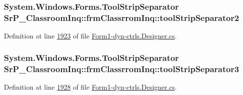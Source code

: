 \hypertarget{class_sr_p___classroom_inq_1_1frm_classrrom_inq_aa51d7952b4dde9caa9d7e111353a2047}{
\subsubsection[{tool\-Strip\-Separator2}]{\setlength{\rightskip}{0pt plus 5cm}\-System.\-Windows.\-Forms.\-Tool\-Strip\-Separator {\bf \-Sr\-P\-\_\-\-Classroom\-Inq\-::frm\-Classrrom\-Inq\-::tool\-Strip\-Separator2}}}
\label{class_sr_p___classroom_inq_1_1frm_classrrom_inq_aa51d7952b4dde9caa9d7e111353a2047}


\-Definition at line \hyperlink{_form1-dyn-ctrls_8_designer_8cs_source_l01923}{1923} of file \hyperlink{_form1-dyn-ctrls_8_designer_8cs_source}{\-Form1-\/dyn-\/ctrls.\-Designer.\-cs}.

\hypertarget{class_sr_p___classroom_inq_1_1frm_classrrom_inq_ac7f725652d980e8ef92f1119843f02a0}{
\subsubsection[{tool\-Strip\-Separator3}]{\setlength{\rightskip}{0pt plus 5cm}\-System.\-Windows.\-Forms.\-Tool\-Strip\-Separator {\bf \-Sr\-P\-\_\-\-Classroom\-Inq\-::frm\-Classrrom\-Inq\-::tool\-Strip\-Separator3}}}
\label{class_sr_p___classroom_inq_1_1frm_classrrom_inq_ac7f725652d980e8ef92f1119843f02a0}


\-Definition at line \hyperlink{_form1-dyn-ctrls_8_designer_8cs_source_l01928}{1928} of file \hyperlink{_form1-dyn-ctrls_8_designer_8cs_source}{\-Form1-\/dyn-\/ctrls.\-Designer.\-cs}.

